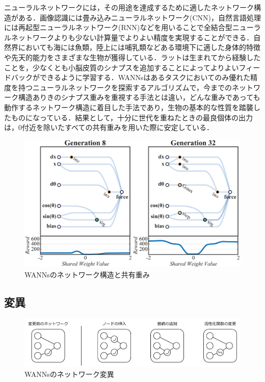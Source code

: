ニューラルネットワークには，その用途を達成するために適したネットワーク構造がある．画像認識には畳み込みニューラルネットワーク(CNN)，自然言語処理には再起型ニューラルネットワーク(RNN)などを用いることで全結合型ニューラルネットワークよりも少ない計算量でよりよい精度を実現することができる\cite{深層学習}．自然界においても海には魚類，陸上には哺乳類などある環境下に適した身体的特徴や先天的能力をさまざまな生物が獲得している\cite{先天的能力}．ラットは生まれてから経験したことを，少なくとも小脳皮質のシナプスを追加することによってよりよいフィードバックができるように学習する\cite{シナプス学習}．WANNsはあるタスクにおいてのみ優れた精度を持つニューラルネットワークを探索するアルゴリズムで，今までのネットワーク構造ありきのシナプス重みを重視する手法とは違い，どんな重みであっても動作するネットワーク構造に着目した手法であり，生物の基本的な性質を踏襲したものになっている．結果として，十分に世代を重ねたときの最良個体の出力は，0付近を除いたすべての共有重みを用いた際に安定している．
\begin{figure}[h]
    \begin{center}
        \includegraphics[width=120mm]{img/wannweight.png}
        \caption{WANNsのネットワーク構造と共有重み}
    \end{center}
\end{figure}

\clearpage
\subsection{変異}

\begin{figure}[h]
    \begin{center}
        \includegraphics[scale=0.8]{img/vary.pdf}
        \caption{WANNsのネットワーク変異}
    \end{center}
\end{figure}

